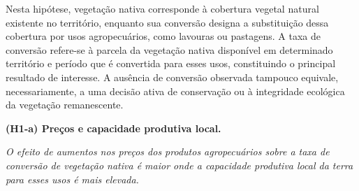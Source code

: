 Nesta hipótese, vegetação nativa corresponde à cobertura vegetal natural existente no território, enquanto sua conversão designa a substituição dessa cobertura por usos agropecuários, como lavouras ou pastagens. A taxa de conversão refere-se à parcela da vegetação nativa disponível em determinado território e período que é convertida para esses usos, constituindo o principal resultado de interesse. A ausência de conversão observada tampouco equivale, necessariamente, a uma decisão ativa de conservação ou à integridade ecológica da vegetação remanescente.

\medskip
\noindent\textbf{(H1-a) Preços e capacidade produtiva local.}

\noindent\emph{O efeito de aumentos nos preços dos produtos agropecuários sobre a taxa de conversão de vegetação nativa é maior onde a capacidade produtiva local da terra para esses usos é mais elevada.}

%
%
%
%
%
%
%
%
%
%
%
%
%
%
%
%
%

